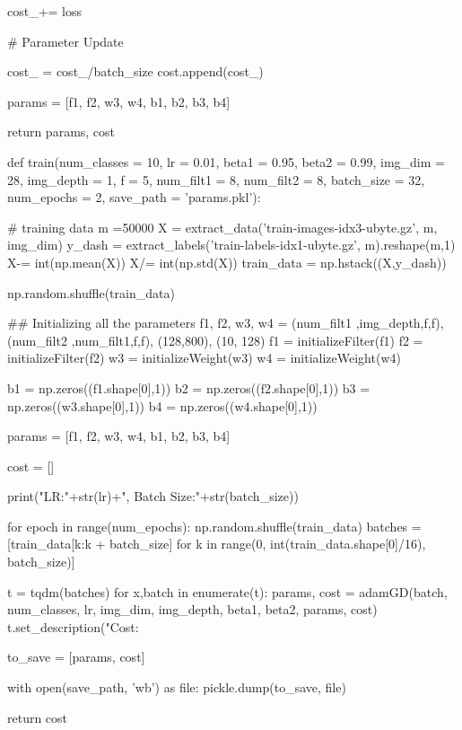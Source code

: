         cost_+= loss

    # Parameter Update  

    

    cost_ = cost_/batch_size
    cost.append(cost_)

    params = [f1, f2, w3, w4, b1, b2, b3, b4]
    
    return params, cost


\stoptyping

\starttyping
def train(num_classes = 10, lr = 0.01, beta1 = 0.95, beta2 = 0.99, img_dim = 28, img_depth = 1, f = 5, num_filt1 = 8, num_filt2 = 8, batch_size = 32, num_epochs = 2, save_path = 'params.pkl'):

    # training data
    m =50000
    X = extract_data('train-images-idx3-ubyte.gz', m, img_dim)
    y_dash = extract_labels('train-labels-idx1-ubyte.gz', m).reshape(m,1)
    X-= int(np.mean(X))
    X/= int(np.std(X))
    train_data = np.hstack((X,y_dash))
    
    np.random.shuffle(train_data)

    ## Initializing all the parameters
    f1, f2, w3, w4 = (num_filt1 ,img_depth,f,f), (num_filt2 ,num_filt1,f,f), (128,800), (10, 128)
    f1 = initializeFilter(f1)
    f2 = initializeFilter(f2)
    w3 = initializeWeight(w3)
    w4 = initializeWeight(w4)

    b1 = np.zeros((f1.shape[0],1))
    b2 = np.zeros((f2.shape[0],1))
    b3 = np.zeros((w3.shape[0],1))
    b4 = np.zeros((w4.shape[0],1))

    params = [f1, f2, w3, w4, b1, b2, b3, b4]

    cost = []

    print("LR:"+str(lr)+", Batch Size:"+str(batch_size))

    for epoch in range(num_epochs):
        np.random.shuffle(train_data)
        batches = [train_data[k:k + batch_size] for k in range(0, int(train_data.shape[0]/16), batch_size)]

        t = tqdm(batches)
        for x,batch in enumerate(t):
            params, cost = adamGD(batch, num_classes, lr, img_dim, img_depth, beta1, beta2, params, cost)
            t.set_description("Cost: %
            
    to_save = [params, cost]
    
    with open(save_path, 'wb') as file:
        pickle.dump(to_save, file)
        
    return cost
\stoptyping


